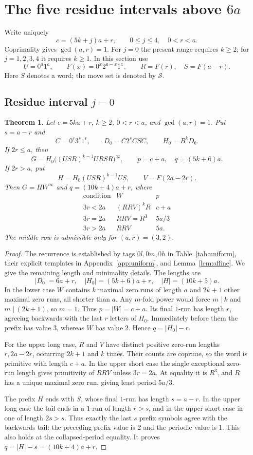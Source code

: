 \documentclass[11pt]{article}
\newtheorem{theorem}{Theorem}[section]
\theoremstyle{remark}\newtheorem{remark}[theorem]{Remark}
\newcommand{\per}{^{\infty}}
\begin{document}
\section{The five residue intervals above \texorpdfstring{$6a$}{6a}}\label{sec:large}
Write uniquely
\[
c=(5k+j)a+r,\qquad 0\le j\le4,\quad 0<r<a.
\]
Coprimality gives $\gcd(a,r)=1$. For $j=0$ the present range requires $k\ge2$; for $j=1,2,3,4$ it requires $k\ge1$. In this section use
\[
U=0^a1^a,\qquad F(x)=0^x2^{a-x}1^x,\qquad R=F(r),\quad S=F(a-r).
\]
Here $S$ denotes a word; the move set is denoted by $\mathcal S$.

\subsection{Residue interval \texorpdfstring{$j=0$}{j=0}}
\begin{theorem}\label{thm:zero}
Let $c=5ka+r$, $k\ge2$, $0<r<a$, and $\gcd(a,r)=1$. Put $s=a-r$ and
\[C=0^r3^s1^r,\qquad D_0=C2^sCSC,\qquad H_0=B^kD_0.\]
If $2r\le a$, then
\[G=H_0\big((USR)^{k-1}URSR\big)\per,\qquad
p=c+a,\quad q=(5k+6)a.\]
If $2r>a$, put
\[H=H_0(USR)^{k-1}US,\qquad V=F(2a-2r).\]
Then $G=HW\per$ and $q=(10k+4)a+r$, where
\[
\begin{array}{c|c|c}
\text{condition}&W&p\\\hline
3r<2a&(RRV)^kR&c+a\\
3r=2a&RRV=R^3&5a/3\\
3r>2a&RRV&5a.
\end{array}
\]
The middle row is admissible only for $(a,r)=(3,2)$.
\end{theorem}
\begin{proof}
The recurrence is established by tags $0l,0m,0h$ in Table~\ref{tab:uniform}, their explicit templates in Appendix~\ref{app:uniform}, and Lemma~\ref{lem:affine}. We give the remaining length and minimality details. The lengths are
\[|D_0|=6a+r,\quad |H_0|=(5k+6)a+r,\quad |H|=(10k+5)a.\]
In the lower case $W$ contains $k$ maximal zero runs of length $a$ and $2k+1$ other maximal zero runs, all shorter than $a$. Any $m$-fold power would force $m\mid k$ and $m\mid(2k+1)$, so $m=1$. Thus $p=|W|=c+a$. Its final $1$-run has length $r$, agreeing backwards with the last $r$ letters of $H_0$. Immediately before them the prefix has value $3$, whereas $W$ has value $2$. Hence $q=|H_0|-r$.

For the upper long case, $R$ and $V$ have distinct positive zero-run lengths $r,2a-2r$, occurring $2k+1$ and $k$ times. Their counts are coprime, so the word is primitive with length $c+a$. In the upper short case the single exceptional zero-run length gives primitivity of $RRV$ unless $3r=2a$. At equality it is $R^3$, and $R$ has a unique maximal zero run, giving least period $5a/3$.

The prefix $H$ ends with $S$, whose final $1$-run has length $s=a-r$. In the upper long case the tail ends in a $1$-run of length $r>s$, and in the upper short case in one of length $2s>s$. Thus exactly the last $s$ prefix symbols agree with the backwards tail: the preceding prefix value is $2$ and the periodic value is $1$. This also holds at the collapsed-period equality. It proves $q=|H|-s=(10k+4)a+r$.
\end{proof}
\end{document}
